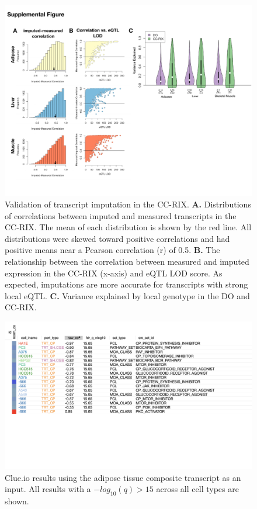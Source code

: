 \documentclass[
]{article}
\begin{document}
\begin{figure}[ht!]
\includegraphics[width=\textwidth]{Figures/Supp_Fig_CC-RIX_Imputation.pdf} 
\caption{Validation of transcript imputation in the CC-RIX. \textbf{A.} 
Distributions of correlations between imputed and measured transcripts 
in the CC-RIX. The mean of each distribution is shown by the red line. 
All distributions were skewed toward positive correlations and had
 positive means near a Pearson correlation (r) of 0.5. \textbf{B.} 
 The relationship between the correlation between measured and 
 imputed expression in the CC-RIX (x-axis) and eQTL LOD score. As 
 expected, imputations are more accurate for transcripts with strong 
 local eQTL. \textbf{C.} Variance explained by local genotype in the 
 DO and CC-RIX. 
}
\label{fig:cc_imputation}
\end{figure}

\begin{figure}[ht!]
\includegraphics[width=\textwidth]{Figures/Supp_Fig_Adipose_all_cell_types.png} 
\caption{Clue.io results using the adipose tissue composite transcript as 
an input. All results with a $-log_{10}(q) > 15$ across all cell types are shown.
}
\label{fig:clue_adipose_all}
\end{figure}
\end{document}
